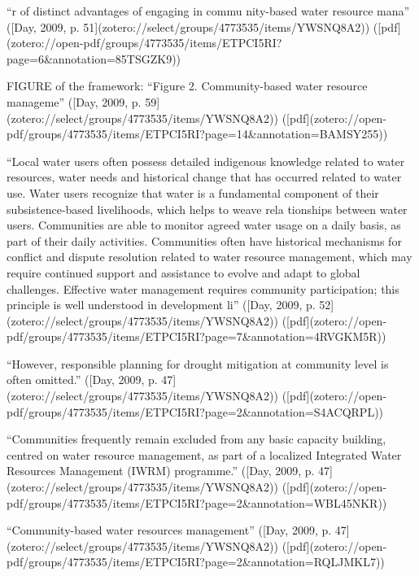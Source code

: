“r of distinct advantages of engaging in commu nity-based water resource mana” ([Day, 2009, p. 51](zotero://select/groups/4773535/items/YWSNQ8A2)) ([pdf](zotero://open-pdf/groups/4773535/items/ETPCI5RI?page=6&annotation=85TSGZK9))

FIGURE of the framework: “Figure 2. Community-based water resource manageme” ([Day, 2009, p. 59](zotero://select/groups/4773535/items/YWSNQ8A2)) ([pdf](zotero://open-pdf/groups/4773535/items/ETPCI5RI?page=14&annotation=BAMSY255))

“Local water users often possess detailed indigenous knowledge related to water resources, water needs and historical change that has occurred related to water use. 
Water users recognize that water is a fundamental component of their subsistence-based livelihoods, which helps to weave rela tionships between water users. 
Communities are able to monitor agreed water usage on a daily basis, as part of their daily activities. 
Communities often have historical mechanisms for conflict and dispute resolution related to water resource management, which may require continued support and assistance to evolve and adapt to global challenges. 
Effective water management requires community participation; this principle is well understood in development li” ([Day, 2009, p. 52](zotero://select/groups/4773535/items/YWSNQ8A2)) ([pdf](zotero://open-pdf/groups/4773535/items/ETPCI5RI?page=7&annotation=4RVGKM5R))

“However, responsible planning for drought mitigation at community level is often omitted.” ([Day, 2009, p. 47](zotero://select/groups/4773535/items/YWSNQ8A2)) ([pdf](zotero://open-pdf/groups/4773535/items/ETPCI5RI?page=2&annotation=S4ACQRPL))

“Communities frequently remain excluded from any basic capacity building, centred on water resource management, as part of a localized Integrated Water Resources Management (IWRM) programme.” ([Day, 2009, p. 47](zotero://select/groups/4773535/items/YWSNQ8A2)) ([pdf](zotero://open-pdf/groups/4773535/items/ETPCI5RI?page=2&annotation=WBL45NKR))

“Community-based water resources management” ([Day, 2009, p. 47](zotero://select/groups/4773535/items/YWSNQ8A2)) ([pdf](zotero://open-pdf/groups/4773535/items/ETPCI5RI?page=2&annotation=RQLJMKL7))






